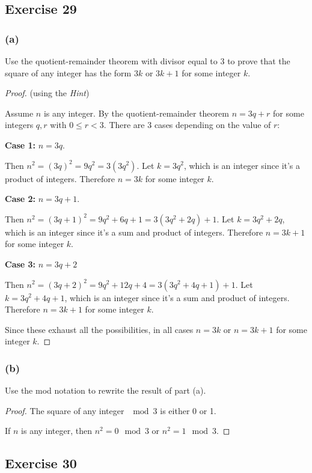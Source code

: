 \documentclass[14pt]{extarticle}
\begin{document}
\subsection{Exercise 29}

\subsubsection{(a)}
Use the quotient-remainder theorem with divisor equal to 3 to prove that the square of any integer has the form $3k$ or $3k + 1$ for some integer $k$.

\begin{proof}
(using the {\it Hint}) 

Assume $n$ is any integer. By the quotient-remainder theorem $n = 3q+r$ for some integers $q,r$ with $0 \leq r < 3$. There are 3 cases depending on the value of $r$:

{\bf Case 1:} $n = 3q$.

Then $n^2 = (3q)^2 = 9q^2 = 3(3q^2)$. Let $k = 3q^2$, which is an integer since it's a product of integers. Therefore $n = 3k$ for some integer $k$.

{\bf Case 2:} $n = 3q + 1$.

Then $n^2 = (3q+1)^2 = 9q^2 + 6q + 1 = 3(3q^2 + 2q) + 1$. Let $k = 3q^2 + 2q$, which is an integer since it's a sum and product of integers. Therefore $n = 3k + 1$ for some integer $k$.

{\bf Case 3:} $n = 3q + 2$

Then $n^2 = (3q+2)^2 = 9q^2 + 12q + 4 = 3(3q^2 + 4q + 1) + 1$. Let $k = 3q^2 + 4q+1$, which is an integer since it's a sum and product of integers. Therefore $n = 3k + 1$ for some integer $k$.

Since these exhaust all the possibilities, in all cases $n = 3k$ or $n = 3k+1$ for some integer $k$.
\end{proof}

\subsubsection{(b)}
Use the mod notation to rewrite the result of part (a).

\begin{proof}
The square of any integer $\mod 3$ is either 0 or 1.

If $n$ is any integer, then $n^2 = 0 \mod 3$ or $n^2 = 1 \mod 3$.
\end{proof}

\subsection{Exercise 30}
\end{document}

